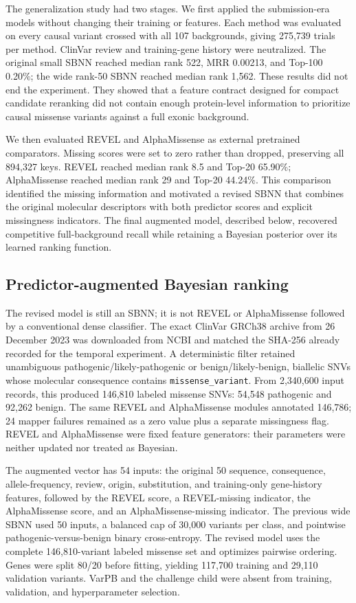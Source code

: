 \documentclass[11pt]{article}
\newcommand{\code}[1]{\texttt{#1}}
\begin{document}
The generalization study had two stages. We first applied the submission-era models without changing their training or features. Each method was evaluated on every causal variant crossed with all 107 backgrounds, giving 275,739 trials per method. ClinVar review and training-gene history were neutralized. The original small SBNN reached median rank 522, MRR 0.00213, and Top-100 0.20\%; the wide rank-50 SBNN reached median rank 1,562. These results did not end the experiment. They showed that a feature contract designed for compact candidate reranking did not contain enough protein-level information to prioritize causal missense variants against a full exonic background.

We then evaluated REVEL and AlphaMissense as external pretrained comparators. Missing scores were set to zero rather than dropped, preserving all 894,327 keys. REVEL reached median rank 8.5 and Top-20 65.90\%; AlphaMissense reached median rank 29 and Top-20 44.24\%. This comparison identified the missing information and motivated a revised SBNN that combines the original molecular descriptors with both predictor scores and explicit missingness indicators. The final augmented model, described below, recovered competitive full-background recall while retaining a Bayesian posterior over its learned ranking function.

\subsection{Predictor-augmented Bayesian ranking}

The revised model is still an SBNN; it is not REVEL or AlphaMissense followed by a conventional dense classifier. The exact ClinVar GRCh38 archive from 26 December 2023 was downloaded from NCBI and matched the SHA-256 already recorded for the temporal experiment. A deterministic filter retained unambiguous pathogenic/likely-pathogenic or benign/likely-benign, biallelic SNVs whose molecular consequence contains \code{missense\_variant}. From 2,340,600 input records, this produced 146,810 labeled missense SNVs: 54,548 pathogenic and 92,262 benign. The same REVEL and AlphaMissense modules annotated 146,786; 24 mapper failures remained as a zero value plus a separate missingness flag. REVEL and AlphaMissense were fixed feature generators: their parameters were neither updated nor treated as Bayesian.

The augmented vector has 54 inputs: the original 50 sequence, consequence, allele-frequency, review, origin, substitution, and training-only gene-history features, followed by the REVEL score, a REVEL-missing indicator, the AlphaMissense score, and an AlphaMissense-missing indicator. The previous wide SBNN used 50 inputs, a balanced cap of 30,000 variants per class, and pointwise pathogenic-versus-benign binary cross-entropy. The revised model uses the complete 146,810-variant labeled missense set and optimizes pairwise ordering. Genes were split 80/20 before fitting, yielding 117,700 training and 29,110 validation variants. VarPB and the challenge child were absent from training, validation, and hyperparameter selection.
\end{document}
